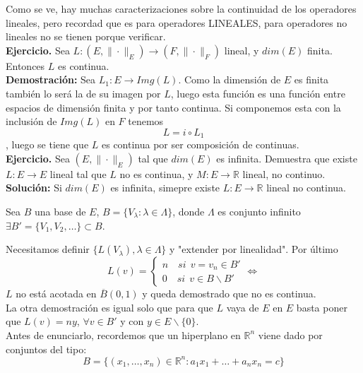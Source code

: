 \documentclass{article}
\begin{document}
Como se ve, hay muchas caracterizaciones sobre la continuidad de los operadores lineales, pero recordad que es para operadores LINEALES, para operadores no lineales no se tienen porque verificar.\\

\textbf{Ejercicio.} Sea $L:(E,\|\cdot\|_E)\rightarrow (F,\|\cdot\|_F)$ lineal, y $dim(E)$ finita. Entonces $L$ es continua.\\

\textbf{Demostración:} Sea $L_1:E\rightarrow Img(L)$. Como la dimensión de $E$ es finita también lo será la de su imagen por $L$, luego esta función es una función entre espacios de dimensión finita y por tanto continua. Si componemos esta con la inclusión de $Img(L)$ en $F$ tenemos
\begin{equation*}
L=i\circ L_1
\end{equation*}
, luego se tiene que $L$ es continua por ser composición de continuas.\\

\textbf{Ejercicio.} Sea $(E,\|\cdot\|_E)$ tal que $dim(E)$ es infinita. Demuestra que existe $L:E\rightarrow E$ lineal tal que $L$ no es continua, y $M:E\rightarrow \mathbb{R}$ lineal, no continuo.\\

\textbf{Solución:} Si $dim(E)$ es infinita, simepre existe $L:E\rightarrow \mathbb{R}$ lineal no continua.

Sea $B$ una base de $E$, $B=\{V_\lambda:\lambda\in \Lambda\}$, donde $\Lambda$ es conjunto infinito $\exists B'=\{V_1,V_2,\ldots\}\subset B$.

Necesitamos definir $\{L(V_\lambda),\lambda\in\Lambda \}$ y "extender por linealidad". Por último
\begin{equation*}
L(v)=\left\lbrace \begin{array}{c}
n\quad si\:\:v=v_n\in B'\\
0\quad si\:\:v\in B\backslash B'
\end{array}\right. \Leftrightarrow 
\end{equation*}
$L$ no está acotada en $\overline{B}(0,1)$ y queda demostrado que no es continua.\\

La otra demostración es igual solo que para que $L$ vaya de $E$ en $E$ basta poner que $L(v)=ny$, $\forall v\in B'$ y con $y\in E\backslash\{0\}$.\\

Antes de enunciarlo, recordemos que un hiperplano en $\mathbb{R}^n$ viene dado por conjuntos del tipo:
\begin{equation*}
B=\{(x_1,\ldots,x_n)\in \mathbb{R}^n:a_1x_1+\ldots+a_nx_n=c\}
\end{equation*}
\end{document}

